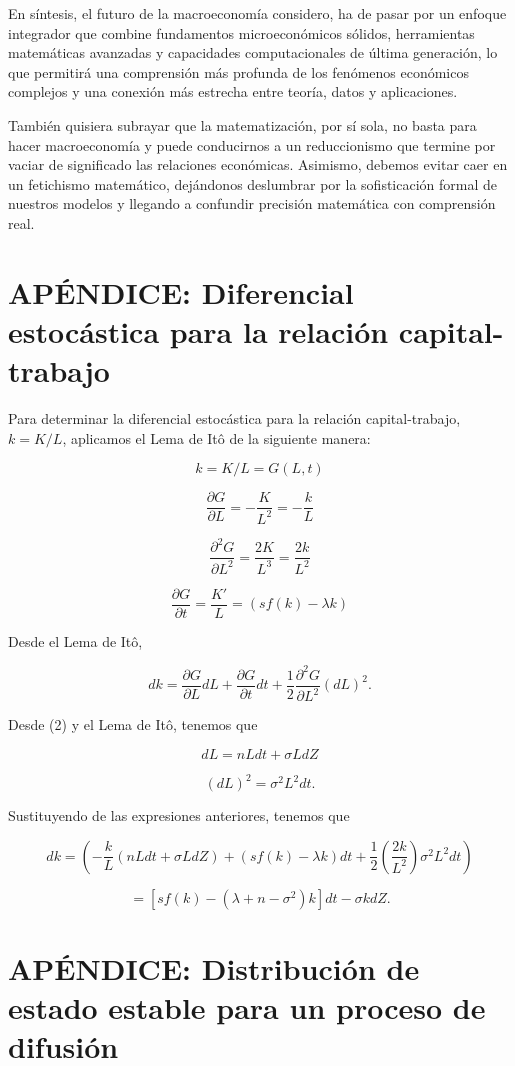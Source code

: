 \documentclass[a4paper,12pt]{article}
\begin{document}
En síntesis, el futuro de la macroeconomía considero, ha de pasar por un enfoque integrador que combine fundamentos microeconómicos sólidos, herramientas matemáticas avanzadas y capacidades computacionales de última generación, lo que permitirá una comprensión más profunda de los fenómenos económicos complejos y una conexión más estrecha entre teoría, datos y aplicaciones.

También quisiera subrayar que la matematización, por sí sola, no basta para hacer macroeconomía y puede conducirnos a un reduccionismo que termine por vaciar de significado las relaciones económicas. Asimismo, debemos evitar caer en un fetichismo matemático, dejándonos deslumbrar por la sofisticación formal de nuestros modelos y llegando a confundir precisión matemática con comprensión real.


\appendix
\newpage
\section{APÉNDICE: Diferencial estocástica para la relación capital-trabajo}

Para determinar la diferencial estocástica para la relación capital-trabajo, \( k = K/L \), aplicamos el Lema de Itô de la siguiente manera:

\[
k = K/L = G(L, t)
\]

\[
\frac{\partial G}{\partial L} = -\frac{K}{L^2} = -\frac{k}{L}
\]

\[
\frac{\partial^2 G}{\partial L^2} = \frac{2K}{L^3} = \frac{2k}{L^2}
\]

\[
\frac{\partial G}{\partial t} = \frac{K'}{L} = (sf(k) - \lambda k)\]

Desde el Lema de Itô,

\[
dk = \frac{\partial G}{\partial L} dL + \frac{\partial G}{\partial t} dt + \frac{1}{2} \frac{\partial^2 G}{\partial L^2} (dL)^2.
\]

Desde (2) y el Lema de Itô, tenemos que

\[
dL = nLdt + \sigma LdZ
\]

\[
(dL)^2 = \sigma^2 L^2 dt.
\]

Sustituyendo de las expresiones anteriores, tenemos que

\[
dk = \left( -\frac{k}{L} (nLdt + \sigma LdZ) + (sf(k) - \lambda k)dt + \frac{1}{2} \left( \frac{2k}{L^2} \right) \sigma^2 L^2 dt \right)
\]

\[
= [sf(k) - (\lambda + n - \sigma^2)k]dt - \sigma k dZ.
\]

\newpage
\section{APÉNDICE: Distribución de estado estable para un proceso de difusión}
\end{document}
